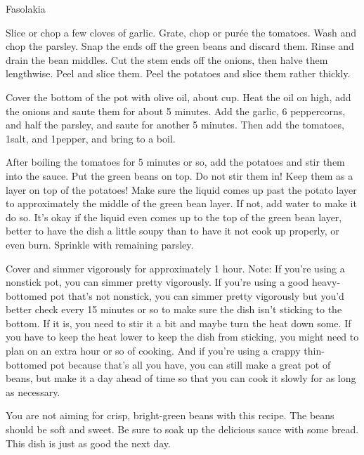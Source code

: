 \begin{recipe}{Fasolakia}

    \begin{ingredients}
    \end{ingredients}

    \begin{instructions}
        Slice or chop a few cloves of garlic.
        Grate, chop or purée the tomatoes.
        Wash and chop the parsley.
        Snap the ends off the green beans and discard them.
        Rinse and drain the bean middles.
        Cut the stem ends off the onions, then halve them lengthwise.
        Peel and slice them.
        Peel the potatoes and slice them rather thickly.

        Cover the bottom of the pot with olive oil, about \half cup.
        Heat the oil on high, add the onions and saute them for about 5 minutes.
        Add the garlic, 6 peppercorns, and half the parsley, and saute for another 5 minutes. 
        Then add the tomatoes, 1\half\tsp salt, and 1\tsp pepper, and bring to a boil.

        After boiling the tomatoes for 5 minutes or so, add the potatoes and stir them into the sauce.
        Put the green beans on top.
        Do not stir them in!
        Keep them as a layer on top of the potatoes!
        Make sure the liquid comes up past the potato layer to approximately the middle of the green bean layer.
        If not, add water to make it do so.
        It's okay if the liquid even comes up to the top of the green bean layer, better to have the dish a little soupy than to have it not cook up properly, or even burn.
        Sprinkle with remaining parsley.

        Cover and simmer vigorously for approximately 1 hour.
        Note: If you're using a nonstick pot, you can simmer pretty vigorously.
        If you're using a good heavy-bottomed pot that's not nonstick, you can simmer pretty vigorously but you'd better check every 15 minutes or so to make sure the dish isn't sticking to the bottom.
        If it is, you need to stir it a bit and maybe turn the heat down some.
        If you have to keep the heat lower to keep the dish from sticking, you might need to plan on an extra hour or so of cooking.
        And if you're using a crappy thin-bottomed pot because that's all you have, you can still make a great pot of beans, but make it a day ahead of time so that you can cook it slowly for as long as necessary.

        You are not aiming for crisp, bright-green beans with this recipe.
        The beans should be soft and sweet.
        Be sure to soak up the delicious sauce with some bread.
        This dish is just as good the next day.
    \end{instructions}
\end{recipe}
